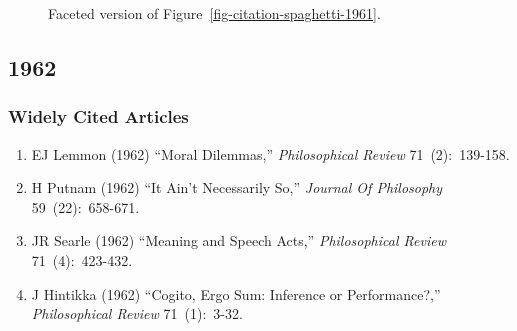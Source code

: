 \documentclass[
  10pt,
  letterpaper,
  DIV=11,
  numbers=noendperiod,
  twoside]{scrartcl}
\providecommand{\tightlist}{%
  \setlength{\itemsep}{0pt}\setlength{\parskip}{0pt}}\usepackage{longtable,booktabs,array}
\begin{document}
\begin{figure}


\caption{\label{fig-citation-facet-1961}Faceted version of
Figure~\ref{fig-citation-spaghetti-1961}.}

\end{figure}%

\newpage

\subsection{1962}\label{sec-s1962}

\subsubsection*{Widely Cited Articles}\label{widely-cited-articles-6}

\begin{enumerate}
\def\labelenumi{\arabic{enumi}.}
\tightlist
\item
  EJ Lemmon (1962) ``Moral Dilemmas,'' \emph{Philosophical Review}
  71~(2):~139-158.
\item
  H Putnam (1962) ``It Ain't Necessarily So,'' \emph{Journal Of
  Philosophy} 59~(22):~658-671.
\item
  JR Searle (1962) ``Meaning and Speech Acts,'' \emph{Philosophical
  Review} 71~(4):~423-432.
\item
  J Hintikka (1962) ``Cogito, Ergo Sum: Inference or Performance?,''
  \emph{Philosophical Review} 71~(1):~3-32.
\end{enumerate}
\end{document}
